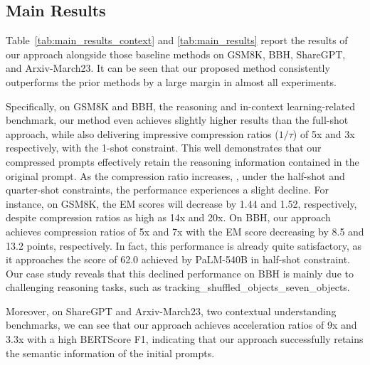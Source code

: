 \subsection{Main Results}

Table~\ref{tab:main_results_context} and \ref{tab:main_results} report the results of our approach alongside those baseline methods %
on GSM8K, BBH, ShareGPT, and Arxiv-March23.
It can be seen that our proposed method consistently outperforms the prior methods by a large margin in almost all experiments.

Specifically, on GSM8K and BBH, the reasoning and in-context learning-related benchmark, our method even achieves slightly higher results than the full-shot approach, while also delivering impressive compression ratios ($1 / \tau$) of 5x and 3x respectively, with the 1-shot constraint.
This well demonstrates that our compressed prompts effectively retain the reasoning information contained in the original prompt.
As the compression ratio increases, \ie, under the half-shot and quarter-shot constraints, the performance experiences a slight decline.
For instance, on GSM8K, the EM scores will decrease by 1.44 and 1.52, respectively, despite compression ratios as high as 14x and 20x.
On BBH, our approach achieves compression ratios of 5x and 7x with the EM score decreasing by 8.5 and 13.2 points, respectively.
In fact, this performance is already quite satisfactory, as it approaches the score of 62.0 achieved by PaLM-540B in half-shot constraint.
Our case study reveals that this declined performance on BBH is mainly due to challenging reasoning tasks, such as tracking\_shuffled\_objects\_seven\_objects.

Moreover, on ShareGPT and Arxiv-March23, two contextual understanding benchmarks, we can see that
our approach achieves acceleration ratios of 9x and 3.3x with a high BERTScore F1, indicating that our approach successfully retains the semantic information of the initial prompts. %

